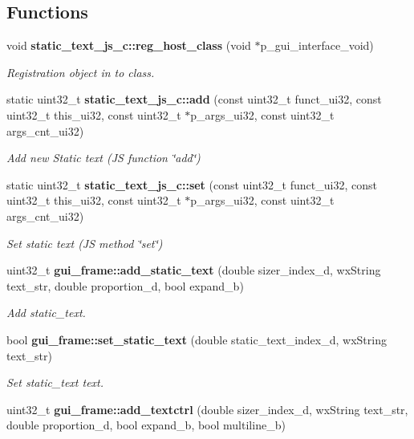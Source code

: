 \subsection*{Functions}
\begin{DoxyCompactItemize}
\item 
void \textbf{ static\+\_\+text\+\_\+js\+\_\+c\+::reg\+\_\+host\+\_\+class} (void $\ast$p\+\_\+gui\+\_\+interface\+\_\+void)
\begin{DoxyCompactList}\small\item\em Registration object in to class. \end{DoxyCompactList}\item 
static uint32\+\_\+t \textbf{ static\+\_\+text\+\_\+js\+\_\+c\+::add} (const uint32\+\_\+t funct\+\_\+ui32, const uint32\+\_\+t this\+\_\+ui32, const uint32\+\_\+t $\ast$p\+\_\+args\+\_\+ui32, const uint32\+\_\+t args\+\_\+cnt\+\_\+ui32)
\begin{DoxyCompactList}\small\item\em Add new Static text (JS function \char`\"{}add\char`\"{}) \end{DoxyCompactList}\item 
static uint32\+\_\+t \textbf{ static\+\_\+text\+\_\+js\+\_\+c\+::set} (const uint32\+\_\+t funct\+\_\+ui32, const uint32\+\_\+t this\+\_\+ui32, const uint32\+\_\+t $\ast$p\+\_\+args\+\_\+ui32, const uint32\+\_\+t args\+\_\+cnt\+\_\+ui32)
\begin{DoxyCompactList}\small\item\em Set static text (JS method \char`\"{}set\char`\"{}) \end{DoxyCompactList}\item 
uint32\+\_\+t \textbf{ gui\+\_\+frame\+::add\+\_\+static\+\_\+text} (double sizer\+\_\+index\+\_\+d, wx\+String text\+\_\+str, double proportion\+\_\+d, bool expand\+\_\+b)
\begin{DoxyCompactList}\small\item\em Add static\+\_\+text. \end{DoxyCompactList}\item 
bool \textbf{ gui\+\_\+frame\+::set\+\_\+static\+\_\+text} (double static\+\_\+text\+\_\+index\+\_\+d, wx\+String text\+\_\+str)
\begin{DoxyCompactList}\small\item\em Set static\+\_\+text text. \end{DoxyCompactList}\item 
uint32\+\_\+t \textbf{ gui\+\_\+frame\+::add\+\_\+textctrl} (double sizer\+\_\+index\+\_\+d, wx\+String text\+\_\+str, double proportion\+\_\+d, bool expand\+\_\+b, bool multiline\+\_\+b)

\end{DoxyCompactItemize}
